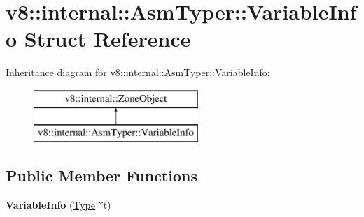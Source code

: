 \hypertarget{structv8_1_1internal_1_1_asm_typer_1_1_variable_info}{}\section{v8\+:\+:internal\+:\+:Asm\+Typer\+:\+:Variable\+Info Struct Reference}
\label{structv8_1_1internal_1_1_asm_typer_1_1_variable_info}
Inheritance diagram for v8\+:\+:internal\+:\+:Asm\+Typer\+:\+:Variable\+Info\+:\begin{figure}[H]
\begin{center}
\leavevmode
\includegraphics[height=2.000000cm]{structv8_1_1internal_1_1_asm_typer_1_1_variable_info}
\end{center}
\end{figure}
\subsection*{Public Member Functions}
\begin{DoxyCompactItemize}
\item 
{\bfseries Variable\+Info} (\hyperlink{classv8_1_1internal_1_1_type}{Type} $\ast$t)\hypertarget{structv8_1_1internal_1_1_asm_typer_1_1_variable_info_af42121b8ac7e6d6dd99bcd962c0fc0fe}{}\label{structv8_1_1internal_1_1_asm_typer_1_1_variable_info_af42121b8ac7e6d6dd99bcd962c0fc0fe}

\end{DoxyCompactItemize}
